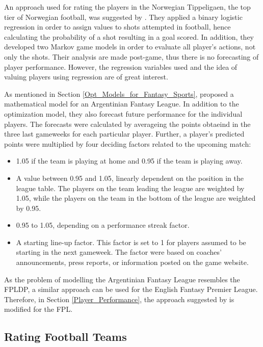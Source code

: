 \newpar

An approach used for rating the players in the Norwegian Tippeligaen, the top tier of Norwegian football, was suggested by \cite{vabo}. They applied a binary logistic regression in order to assign values to shots attempted in football, hence calculating the probability of a shot resulting in a goal scored. In addition, they developed two Markov game models in order to evaluate all player's actions, not only the shots. Their analysis are made post-game, thus there is no forecasting of player performance. However, the regression variables used and the idea of valuing players using regression are of great interest.

\newpar

As mentioned in Section \ref{Opt_Models_for_Fantasy_Sports}, \cite{Bonomo} proposed a mathematical model for an Argentinian Fantasy League. In addition to the optimization model, they also forecast future performance for the individual players. The forecasts were calculated by averageing the points obtaeind in the three last gameweeks for each particular player. Further, a player's predicted points were multiplied by four deciding factors related to the upcoming match:
\begin{itemize}
    \item 1.05 if the team is playing at home and 0.95 if the team is playing away.
    \item A value between 0.95 and 1.05, linearly dependent on the position in the league table. The players on the team leading the league are weighted by 1.05, while the players on the team in the bottom of the league are weighted by 0.95.
    \item 0.95 to 1.05, depending on a performance streak factor.
    \item A starting line-up factor. This factor is set to 1 for players assumed to be starting in the next gameweek. The factor were based on coaches’ announcements, press reports, or information posted on the game website. 
\end{itemize}

As the problem of modelling the Argentinian Fantasy League resembles the FPLDP, a similar approach can be used for the English Fantasy Premier League. Therefore, in Section \ref{Player_Performance}, the approach suggested by \cite{Bonomo} is modified for the FPL.

\subsection{Rating Football Teams} \label{Strength_of_football_teams} 

